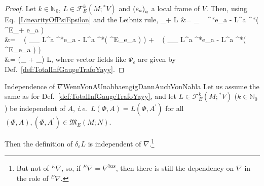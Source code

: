 \documentclass[a4paper,oneside,11pt,leqno]{scrartcl} %
\def\bas#1\eas{\begin{align*}#1\end{align*}}
\theoremstyle{plain}
\theoremstyle{remark}
\theoremstyle{definition}
\begin{document}
\begin{proof}
\leavevmode\newline
Let $k \in \mathbb{N}_0$, $L \in \mathcal{F}^k_E(M; {}^*V)$ and $\mleft( e_a \mright)_a$ a local frame of $V$. Then, using Eq.~\eqref{LinearityOfPsiEpsilon} and the Leibniz rule,
\bas
\delta_{\alpha \varepsilon + \beta \vartheta} L
&=
_{ }
 \otimes ~ {}^*e_a
	- L^a \otimes {}^*\mleft( {}^E\nabla_{\alpha \varepsilon + \beta \vartheta} e_a \mright)
\\
&=
\alpha ~ \mleft(
	_{\Psi_\varepsilon} L^a \otimes {}^*e_a
	- L^a \otimes {}^*\mleft( {}^E\nabla_\varepsilon e_a \mright)
\mright)
	+ \beta ~ \mleft(
	_{\Psi_\vartheta} L^a \otimes {}^*e_a
	- L^a \otimes {}^*\mleft( {}^E\nabla_\vartheta e_a \mright)
\mright)
\\
&=
\mleft(\alpha \delta_\varepsilon
	+ \beta \delta_\vartheta\mright) L,
\eas
where vector fields like $\Psi_\varepsilon$ are given by Def.~\ref{def:TotalInfGaugeTrafoYayy}.
\end{proof}

\begin{corollaries}{Independence of $\nabla$}{WennVonAUnabhaengigDannAuchVonNabla}
Let us assume the same as for Def.~\ref{def:TotalInfGaugeTrafoYayy}, and let $L \in \mathcal{F}^k_E(M; {}^*V)$ ($k \in \mathbb{N}_0$) be independent of $A$, \textit{i.e.}~$L(\Phi,A) = L(\Phi, A^\prime)$ for all $(\Phi,A), (\Phi, A^\prime) \in \mathfrak{M}_E(M; N)$.

Then the definition of $\delta_\varepsilon L$ is independent of $\nabla$.\footnote{But not of ${}^E\nabla$, so, if ${}^E\nabla = \nabla^{\mathrm{bas}}$, then there is still the dependency on $\nabla$ in the role of ${}^E\nabla$.}
\end{corollaries}
\end{document}
